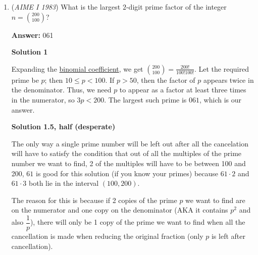 \begin{enumerate}
\textbf{Solution 9}

Lets use complementary counting. First, we must find the probability that no $3$ chosen people are sitting next to each other. We claim that if there are $n$ people around the circle, and $k$ chosen people, this probability is simply 
 \[\dfrac{n}{k}\dbinom{n-k-1}{k-1}\] Now, we can just plug it in to get a total of $1750$ ways. The denominator is simply $\dbinom{25}{3}=2300$. Now, our probability is simply $\dfrac{1750}{2300}$. But, this is the opposite of what we want. We want $1-\dfrac{1750}{2300} = \dfrac{11}{46} \Longrightarrow \boxed{057}$.

 -jb2015007

 


	\item (\textit{AIME I 1983}) What is the largest $2$-digit prime factor of the integer $n = {200\choose 100}$?


 
 \textbf{Answer: }061



\textbf{Solution 1}

Expanding the \href{https://artofproblemsolving.com/wiki/index.php?title=Combination}{binomial coefficient}, we get ${200 \choose 100}=\frac{200!}{100!100!}$. Let the required prime be $p$; then $10 \le p < 100$. If $p > 50$, then the factor of $p$ appears twice in the denominator. Thus, we need $p$ to appear as a factor at least three times in the numerator, so $3p<200$. The largest such prime is $\boxed{061}$, which is our answer.

 



\textbf{Solution 1.5, half (desperate)}

The only way a single prime number will be left out after all the cancelation will have to satisfy the condition that out of all the multiples of the prime number we want to find, 2 of the multiples will have to be between 100 and 200, $61$ is good for this solution (if you know your primes) because $61 \cdot 2$ and $61 \cdot 3$ both lie in the interval $(100, 200)$.

 The reason for this is because if 2 copies of the prime $p$ we want to find are on the numerator and one copy on the denominator (AKA it contains $p^2$ and also $\dfrac{1}{p}$), there will only be 1 copy of the prime we want to find when all the cancellation is made when reducing the original fraction (only $p$ is left after cancellation).

 




\end{enumerate}
